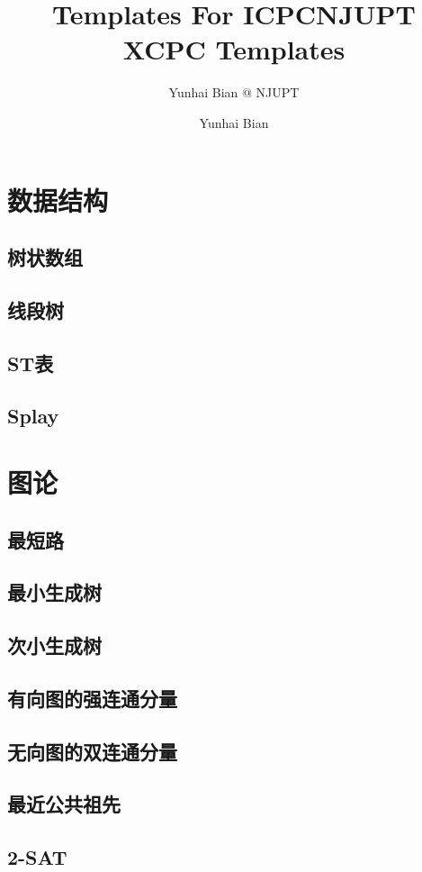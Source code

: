 \documentclass[10pt,a4paper]{article}
\title{Templates For ICPC}
\author{Yunhai Bian @ NJUPT}
\begin{document}
\title{NJUPT XCPC Templates}
\author {Yunhai Bian}
\maketitle
\tableofcontents
\newpage
\section{数据结构}
\subsection{树状数组}

\subsection{线段树}

\subsection{ST表}

\subsection{Splay}

\section{图论}
\subsection{最短路}
\subsection{最小生成树}
\subsection{次小生成树}
\subsection{有向图的强连通分量}
\subsection{无向图的双连通分量}
\subsection{最近公共祖先}
\subsection{2-SAT}
\end{document}
